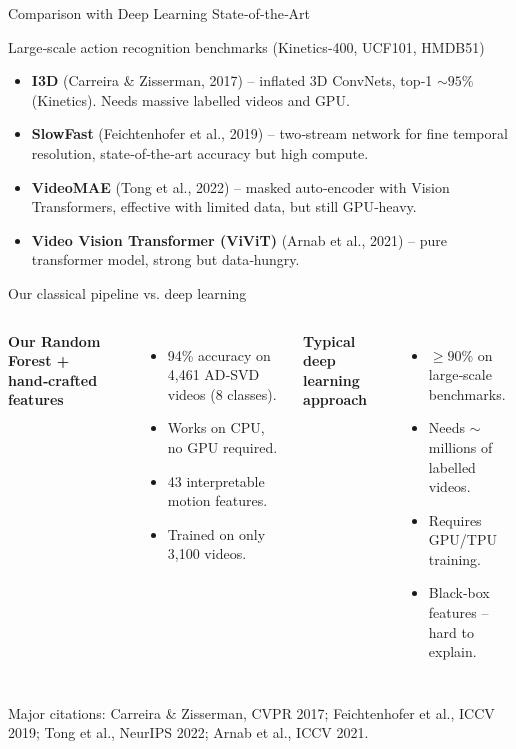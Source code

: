 \documentclass[compress,aspectratio=169]{beamer}
\begin{document}
\begin{frame}{Comparison with Deep Learning State‑of‑the‑Art}
  \small
  \begin{block}{Large‑scale action recognition benchmarks (Kinetics‑400, UCF101, HMDB51)}
    \begin{itemize}
      \item \textbf{I3D} (Carreira \& Zisserman, 2017) – inflated 3D ConvNets, top‑1 \(\sim 95\%\) (Kinetics). Needs massive labelled videos and GPU.
      \item \textbf{SlowFast} (Feichtenhofer et al., 2019) – two‑stream network for fine temporal resolution, state‑of‑the‑art accuracy but high compute.
      \item \textbf{VideoMAE} (Tong et al., 2022) – masked auto‑encoder with Vision Transformers, effective with limited data, but still GPU‑heavy.
      \item \textbf{Video Vision Transformer (ViViT)} (Arnab et al., 2021) – pure transformer model, strong but data‑hungry.
    \end{itemize}
  \end{block}
  \vspace{0.2cm}
  \begin{alertblock}{Our classical pipeline vs. deep learning}
    \begin{columns}[t]
      \textbf{Our Random Forest + hand‑crafted features}
      \begin{itemize}
        \item 94\% accuracy on 4,461 AD‑SVD videos (8 classes).
        \item Works on CPU, no GPU required.
        \item 43 interpretable motion features.
        \item Trained on only 3,100 videos.
      \end{itemize}
      \textbf{Typical deep learning approach}
      \begin{itemize}
        \item \(\geq 90\%\) on large‑scale benchmarks.
        \item Needs \(\sim\) millions of labelled videos.
        \item Requires GPU/TPU training.
        \item Black‑box features – hard to explain.
      \end{itemize}
    \end{columns}
  \end{alertblock}
  \vspace{0.1cm}
  \footnotesize
  Major citations: \alert{Carreira \& Zisserman, CVPR 2017}; \alert{Feichtenhofer et al., ICCV 2019}; \alert{Tong et al., NeurIPS 2022}; \alert{Arnab et al., ICCV 2021}.
\end{frame}
\end{document}
